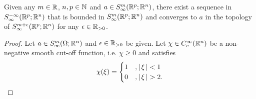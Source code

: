 \documentclass{article}
\begin{document}
\begin{flemma}
    Given any $m \in {\ensuremath {\mathbb R}}$, $n, p \in {\ensuremath {\mathbb N}}$ and $a \in S^{m}_\infty({\mathbb R}^p; {\mathbb R}^n)$, there exist a sequence in $S^{-\infty}_\infty({\mathbb R}^p; {\mathbb R}^n)$ that is bounded in $S^{m}_\infty({\mathbb R}^p; {\mathbb R}^n)$ and converges to $a$ in the topology of $S^{m + \epsilon}_\infty({\mathbb R}^p; {\mathbb R}^n)$ for any $\epsilon \in {\ensuremath {\mathbb R}}_{> 0}$. 
\end{flemma}
\begin{proof}
    Let $a \in S^{m}_\infty(\Omega; {\mathbb R}^n)$ and $\epsilon \in {\ensuremath {\mathbb R}}_{>0}$ be given. Let $\chi \in C^\infty_c({\mathbb R}^n)$ be a non-negative smooth cut-off function, i.e. $\chi \geq 0$  and satisfies
    \begin{align*}
    \chi(\xi) = 
    \begin{cases}
    1 & ,\left|\, \xi\,\right| < 1 \\
    0 & ,\left|\, \xi\,\right| > 2. 
    \end{cases}
    \end{align*}
    

\end{proof}
\end{document}
